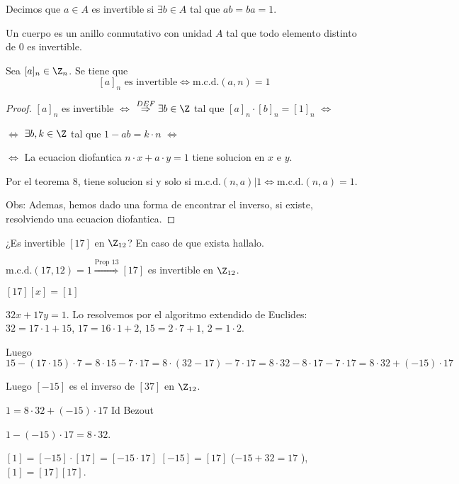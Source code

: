 \begin{definition}
	Decimos que \(a \in A\) es invertible si \(\exists  b \in A \) tal que \(ab = ba = 1 \).
\end{definition}
\begin{definition}
	Un cuerpo es un anillo conmutativo con unidad \(A \) tal que todo elemento distinto de \(0 \) es invertible.
\end{definition}

\begin{proposition}
	Sea \([a]_n \in \Z_n \). Se tiene que
	\[
		[a]_n \text{ es invertible} \iff  \mathrm{m.c.d.}(a,n) = 1
	\]
\end{proposition}
\begin{proof}
	\([a]_n \) es invertible \(\iff \) \(\overset{DEF}{\Rightarrow} \exists b \in \Z \) tal que \([a]_n \cdot [b]_n = [1]_n \) \(\iff \)

	\(\iff \)   \( \exists  b, k \in \Z \) tal que \(1 - ab = k \cdot n \) \(\iff \)

	\(\iff  \) La ecuacion diofantica \(n \cdot x + a \cdot y = 1 \) tiene solucion en \(x \) e \(y \).

	Por el teorema 8, tiene solucion si y solo si \(\mathrm{m.c.d.}(n,a)| 1 \iff  \mathrm{m.c.d.}(n,a) = 1 \).

	Obs: Ademas, hemos dado una forma de encontrar el inverso, si existe, resolviendo una ecuacion diofantica.
\end{proof}

\begin{example}
	¿Es invertible \([17 ]\) en \(\Z_{12 }\)? En caso de que exista hallalo.

	\(\mathrm{m.c.d.}(17,12) = 1 \overset{\text{Prop 13}}{\Rightarrow} [17] \) es invertible en \(\Z_{12 }\).

	\([17][x] = [1 ]\)

	\(32x + 17y = 1 \). Lo resolvemos por el algoritmo extendido de Euclides: \(32 = 17 \cdot 1 + 15 \), \(17 = 16 \cdot 1 + 2 \), \(15 = 2 \cdot 7 + 1 \), \(2 = 1 \cdot 2 \).

	Luego \(15 - (17 \cdot 15) \cdot 7 = 8 \cdot 15 - 7 \cdot 17 = 8 \cdot (32 - 17) - 7 \cdot 17 = 8 \cdot 32 - 8 \cdot 17 - 7 \cdot 17 = 8 \cdot 32 + (-15) \cdot 17 \)

	Luego \([-15 ]\) es el inverso de \([37]\) en \(\Z_{12 }\).

	\(1 = 8 \cdot 32 + (-15) \cdot 17 \) Id Bezout

	\(1 - (-15) \cdot 17 = 8 \cdot 32 \).

	\([1] = [-15] \cdot [17] = [-15 \cdot 17]\) \([-15] = [17]\) (\(-15 + 32 = 17\) ), \([1] = [17][17]\).
\end{example}

